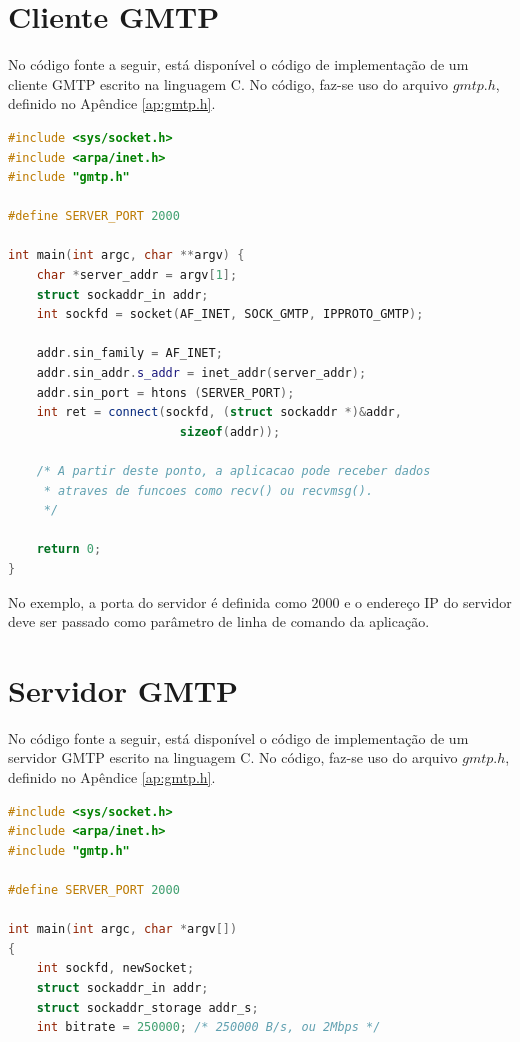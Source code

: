 \begin{apendicesenv}
\section{Cliente GMTP}
\label{ap:cliente-gmtp}

No código fonte a seguir, está disponível o código de implementação de um cliente GMTP escrito na linguagem C. No código, faz-se uso do arquivo $gmtp.h$, definido no Apêndice \ref{ap:gmtp.h}.

\begin{lstlisting}[language=C++, caption={Trecho de código de um cliente GMTP escrito na linguagem C.}, label={list:client-gmtp}]
#include <sys/socket.h>
#include <arpa/inet.h>
#include "gmtp.h"

#define SERVER_PORT 2000

int main(int argc, char **argv) {
	char *server_addr = argv[1];
	struct sockaddr_in addr;
	int sockfd = socket(AF_INET, SOCK_GMTP, IPPROTO_GMTP);
	
	addr.sin_family = AF_INET;
	addr.sin_addr.s_addr = inet_addr(server_addr);
	addr.sin_port = htons (SERVER_PORT);
	int ret = connect(sockfd, (struct sockaddr *)&addr,
						sizeof(addr));
						
	/* A partir deste ponto, a aplicacao pode receber dados
	 * atraves de funcoes como recv() ou recvmsg().
	 */
	
	return 0;
}
\end{lstlisting}

No exemplo, a porta do servidor é definida como $2000$ e o endereço IP do servidor deve ser passado como parâmetro de linha de comando da aplicação.

\section{Servidor GMTP}
\label{ap:servidor-gmtp}

No código fonte a seguir, está disponível o código de implementação de um servidor GMTP escrito na linguagem C. No código, faz-se uso do arquivo $gmtp.h$, definido no Apêndice \ref{ap:gmtp.h}.

\begin{lstlisting}[language=C++, caption={Trecho de código de um servidor GMTP escrito na linguagem C.}, label={list:servidor-gmtp}]
#include <sys/socket.h>
#include <arpa/inet.h>
#include "gmtp.h"

#define SERVER_PORT 2000

int main(int argc, char *argv[])
{
	int sockfd, newSocket;
	struct sockaddr_in addr;
	struct sockaddr_storage addr_s;
	int bitrate = 250000; /* 250000 B/s, ou 2Mbps */


\end{lstlisting}
\end{apendicesenv}
